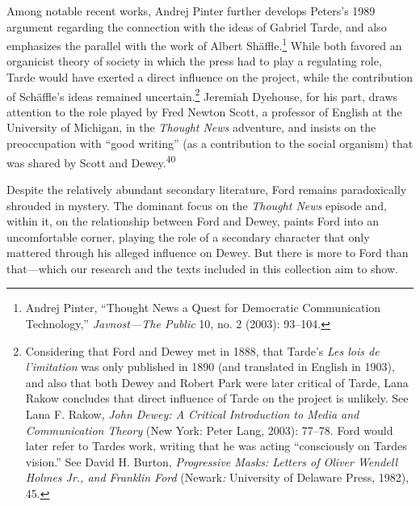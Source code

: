 \documentclass[twoside,symmetric,nobib,justified]{tufte-book}
\begin{document}
\enlargethispage{\baselineskip}

Among notable recent works, Andrej Pinter further develops Peters's 1989
argument regarding the connection with the ideas of Gabriel Tarde, and
also emphasizes the parallel with the work of Albert Shäffle.\footnote{Andrej
  Pinter, ``Thought News a Quest for Democratic Communication
  Technology,'' \emph{Javnost---The Public} 10, no. 2 (2003): 93--104.}
While both favored an organicist theory of society in which the press
had to play a regulating role, Tarde would have exerted a direct
influence on the project, while the contribution of Schäffle's ideas
remained uncertain.\footnote{Considering that Ford and Dewey met in
  1888, that Tarde's \emph{Les lois de l'imitation} was only published
  in 1890 (and translated in English in 1903), and also that both Dewey
  and Robert Park were later critical of Tarde, Lana Rakow concludes
  that direct influence of Tarde on the project is unlikely. See Lana F.
  Rakow, \emph{John Dewey: A Critical Introduction to Media and
  Communication Theory} (New York: Peter Lang, 2003): 77­--78. Ford would
  later refer to Tarde\textquotesingle s work, writing that he was
  acting ``consciously on Tarde\textquotesingle s vision.'' See David H.
  Burton, \emph{Progressive Masks: Letters of Oliver Wendell Holmes Jr.,
  and Franklin Ford} (Newark\emph{:} University of Delaware Press,
  1982), 45.} Jeremiah Dyehouse, for his part, draws attention to the
role played by Fred Newton Scott, a professor of English at the
University of Michigan, in the \emph{Thought News} adventure, and
insists on the preoccupation with ``good writing'' (as a contribution to
the social organism) that was shared by Scott and Dewey.\textsuperscript{40}

Despite the relatively abundant secondary literature, Ford remains
paradoxically shrouded in mystery. The dominant focus on the
\emph{Thought News} episode and, within it, on the relationship between
Ford and Dewey, paints Ford into an uncomfortable corner, playing the
role of a secondary character that only mattered through his alleged
influence on Dewey. But there is more to Ford than that---which our
research and the texts included in this collection aim to show.
\end{document}
